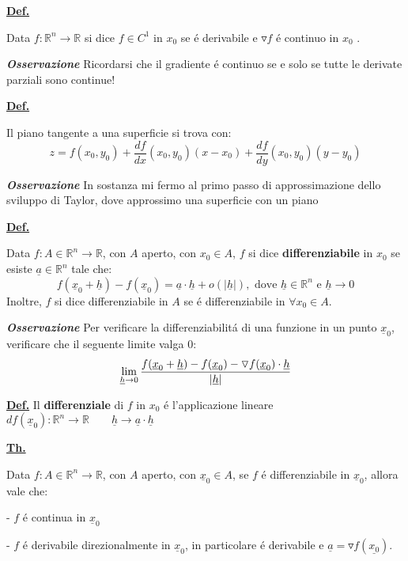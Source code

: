 \documentclass[a4paper,10pt]{article} %
\renewcommand{\b}[1]{%
    {\textbf{#1}}}
\renewcommand{\v}[1]{%
    {\underline{#1}}}
\newcommand{\ldef}[1]{%
    {\smallbreak\par\tiny\textbf{\underline{Def.}} {#1} \smallbreak}}
\newcommand{\ltheorem}[1]{%
    {\smallbreak\par\tiny\textbf{\underline{Th.}} {#1} \smallbreak\par}}
\newcommand{\ldim}[1]{%
    {\smallbreak\par\tiny\emph{\textbf{Dimostrazione}} {#1} \par}}
\newcommand{\loss}[1]{%
    {\smallbreak\par\tiny\emph{\textbf{Osservazione}} {#1} \par}}
\renewcommand{\ldim}[1]{{}}
\begin{document}
\begin{multicols}{6}
\ldef{
    Data $ f : \mathbb{R}^n \rightarrow \mathbb{R} $ si dice $f \in C^1$ in $x_0$ se é derivabile 
    e $ \triangledown f $ é continuo in $x_0$ .
    \loss{
        Ricordarsi che il gradiente é continuo se e solo se tutte le derivate parziali sono continue!
    }
}

\ldef{
    Il piano tangente a una superficie si trova con:
    \[
        z = f(x_0, y_0) + \frac{df}{dx} (x_0, y_0)(x - x_0) + \frac{df}{dy} (x_0, y_0)(y - y_0)
    \]
    \loss{
        In sostanza mi fermo al primo passo di approssimazione dello sviluppo di Taylor, dove 
        approssimo una superficie con un piano
    }
}





\medbreak\dotfill\medbreak





\ldef{
    Data $ f : A \in \mathbb{R}^n \rightarrow \mathbb{R}$, con $A$ aperto, con $x_0 \in A$, $f$ si 
    dice \b{differenziabile} in $x_0$ se esiste $\v{a} \in \mathbb{R}^n $ tale che:
    \[
        f(\v{x}_0 + \v{h}) - f(\v{x}_0) = \v{a} \cdot \v{h} + o(|\v{h}|), 
        \text{ dove } \v{h} \in \mathbb{R}^n \text{ e } \v{h} \rightarrow 0
    \]
    Inoltre, $f$ si dice differenziabile in $A$ se é differenziabile in $\forall x_0 \in A$.
    \loss{
        Per verificare la differenziabilit\'{a} di una funzione in un punto $\v{x}_0$, verificare che il seguente limite valga 0:
        \[
            \lim_{\v{h} \rightarrow 0} \frac{f(\v{x}_0 + \v{h}) - f(\v{x}_0) - \triangledown f(\v{x}_0) \cdot \v{h} }{|\v{h}|}
        \]
    }
}

\ldef{
    Il \b{differenziale} di $f$ in $x_0$ é l'applicazione lineare 
    $d f(\v{x}_0) : \mathbb{R}^n \rightarrow \mathbb{R} \quad 
    \quad \v{h} \rightarrow \v{a} \cdot \v{h}$
}

\ltheorem{
    Data $ f:A\in\mathbb{R}^n\rightarrow\mathbb{R}$, con $A$ aperto, con $\v{x}_0\in A$, se $f$ é differenziabile in $\v{x}_0$, allora vale che:

    - $f$ é continua in $\v{x}_0$
    \ldim{
        $ f(\v{x}_0 + \v{h}) - f(\v{x}_0) = \v{a}\cdot \v{h} + o(|\v{h}|) \rightarrow 0$
        $ \implies \lim_{t \rightarrow 0} f(\v{x}_0 + \v{h}) = f(\v{x}_0)$
    }

    - $f$ é derivabile direzionalmente in $\v{x}_0$, in particolare é derivabile e 
    $\v{a} = \triangledown f(\v{x_0})$.
    \ldim{
        Pongo $\v{h} = t\v{e}_j$, $t \in \mathbb{R} $, $t \rightarrow 0$, $ \v{e}_j = (0, 0, \dots , 1, \dots )$ con un 1 alla j-esima posizione.
        \begin{gather*}
            f(\v{x}_0 + t\v{v}) - f(\v{x}_0) = \v{a} \cdot t \v{e}_j + o(|t|) \implies \\
            \frac{1}{t} (f(\v{x}_0 + t\v{e}_j) - f(\v{x}_0)) = \v{a}\,\v{e}_j + \frac{o(|t|)}{t}\implies \\
            \lim_{t \rightarrow 0} f(\v{x}_0 + t\v{e}_j) - f(\v{x}_0) = \v{a}_j
        \end{gather*}
        Tuttavia, questo dimostra solo la derivabilitá.
        Per dimostrare che é derivabile direzionalmente, vedere la prossima dimostrazione.
        
}}
\end{multicols}
\end{document}
